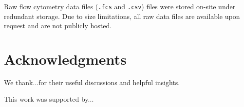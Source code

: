 Raw flow cytometry data files (\texttt{.fcs} and \texttt{.csv}) files were
stored on-site under redundant storage. Due to size limitations, all raw data
files are available upon request and are not publicly hosted.

\section*{Acknowledgments}

We thank...for their useful discussions and helpful insights.

This work was supported by...
